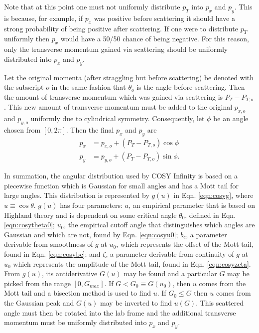 Note that at this point one must not uniformly distribute $p_T$ into $p_x$ and $p_y$. This is because, for example, if $p_x$ was positive before scattering it should have a strong probability of being positive after scattering. If one were to distribute $p_T$ uniformly then $p_x$ would have a 50/50 chance of being negative. For this reason, only the transverse momentum gained via scattering should be uniformly distributed into $p_x$ and $p_y$.

Let the original momenta (after straggling but before scattering) be denoted with the subscript $o$ in the same fashion that $\theta_o$ is the angle before scattering. Then the amount of transverse momentum which was gained via scattering is $P_T-P_{T,o}$. This new amount of transverse momentum must be added to the original $p_{x,o}$ and $p_{y,o}$ uniformly due to cylindrical symmetry. Consequently, let $\phi$ be an angle chosen from $[0,2\pi]$. Then the final $p_x$ and $p_y$ are
\begin{align*}
p_x&=p_{x,o}+(P_T-P_{T,o})\cos\phi\\
p_y&=p_{y,o}+(P_T-P_{T,o})\sin\phi.
\end{align*}

In summation, the angular distribution used by COSY Infinity is based on a piecewise function which is Gaussian for small angles \cite{gs} and has a Mott tail for large angles. This distribution is represented by $g(u)$ in Eqn. \ref{eqn:cosyg}, where $u\equiv \cos\theta$. $g(u)$ has four parameters: $a$, an empirical parameter that is based on Highland theory \cite{highland} and is dependent on some critical angle $\theta_0$, defined in Eqn. \ref{eqn:cosytheta0}; $u_0$, the empirical cutoff angle that distinguishes which angles are Gaussian and which are not, found by Eqn. \ref{eqn:cosyu0}; $b_c$, a parameter derivable from smoothness of $g$ at $u_0$, which represents the offset of the Mott tail, found in Eqn. \ref{eqn:cosybc}; and $\zeta$, a parameter derivable from continuity of $g$ at $u_0$ which represents the amplitude of the Mott tail, found in Eqn. \ref{eqn:cosyzeta}. From $g(u)$, its antiderivative $G(u)$ may be found and a particular $G$ may be picked from the range $[0,G_{max}]$. If $G<G_0 \equiv G(u_0)$, then $u$ comes from the Mott tail and a bisection method is used to find $u$. If $G_0 \leq G$ then $u$ comes from the Gaussian peak and $G(u)$ may be inverted to find $u(G)$. This scattered angle must then be rotated into the lab frame and the additional transverse momentum must be uniformly distributed into $p_x$ and $p_y$.

